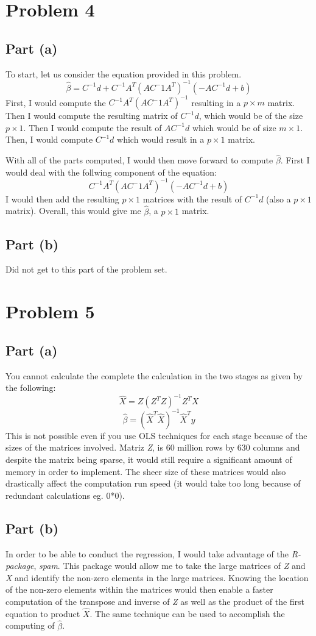 \documentclass{article}\usepackage[]{graphicx}\usepackage[]{color}
\begin{document}
\section{Problem 4}
\subsection{Part (a)}
To start, let us consider the equation provided in this problem.
\[ \hat{\beta} = C^{-1}d + C^{-1}A^T(AC^-1A^T)^{-1}(-AC^{-1}d + b)\]
First, I would compute the $C^{-1}A^T(AC^-1A^T)^{-1}$ resulting in a $p \times m$ matrix.  Then I would compute the resulting matrix of $C^{-1}d$, which would be of the size $p \times 1$.  Then I would compute the result of $A C^{-1} d$ which would be of size $m \times 1$.  Then, I would compute $C^{-1}d$ which would result in a $p \times 1$ matrix.
\par With all of the parts computed, I would then move forward to compute $\hat{\beta}$.  First I would deal with the follwing component of the equation:
\[C^{-1}A^T(AC^-1A^T)^{-1}(-AC^{-1}d + b)\]
I would then add the resulting $p \times 1$ matrices with the result of $C^{-1}d$ (also a $p \times 1$ matrix).  Overall, this would give me $\hat{\beta}$, a $p \times 1$ matrix.
\subsection{Part (b)}
Did not get to this part of the problem set.
\section{Problem 5}
\subsection{Part (a)}
You cannot calculate the complete the calculation in the two stages as given by the following:
\[ \hat{X} = Z( Z^T Z )^{-1} Z^T X \]
\[ \hat{\beta} = (\hat{X}^T \hat{X})^{-1} \hat{X}^T y \]
This is not possible even if you use OLS techniques for each stage because of the sizes of the matrices involved.  Matriz \emph{Z}, is 60 million rows by 630 columns and despite the matrix being sparse, it would still require a significant amount of memory in order to implement.  The sheer size of these matrices would also drastically affect the computation run speed (it would take too long because of redundant calculations eg. 0*0).
\subsection{Part (b)}
In order to be able to conduct the regression, I would take advantage of the \emph{R-package}, \emph{spam}.  This package would allow me to take the large matrices of \emph{Z} and \emph{X} and identify the non-zero elements in the large matrices.  Knowing the location of the non-zero elements within the matrices would then enable a faster computation of the transpose and inverse of \emph{Z} as well as the product of the first equation to product $\hat{X}$.  The same technique can be used to accomplish the computing of $\hat{\beta}$.
\end{document}
